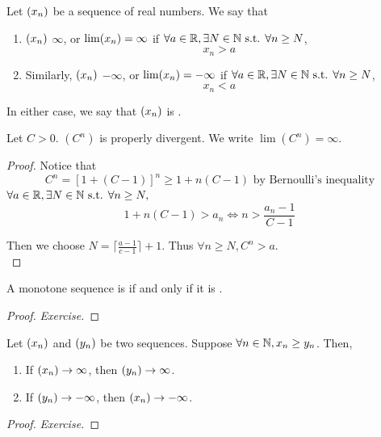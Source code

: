 \documentclass[a4paper,12pt]{article}
\begin{document}
\begin{definition}
    Let \((x_{n})\) be a sequence of real numbers. We say that 
    \begin{enumerate}
        \item \((x_{n})\)  \(\infty\), or \(\lim(x_{n})=\infty\) if \(\forall a\in\mathbb{R},\exists N\in\mathbb{N} \text{ s.t. } \forall n\ge N\),
        \[x_n>a\]
        \item Similarly, \((x_{n})\)  \(-\infty\), or \(\lim(x_{n})=-\infty\) if \(\forall a\in\mathbb{R},\exists N\in\mathbb{N} \text{ s.t. } \forall n\ge N\),
        \[x_n<a\]
    \end{enumerate}

    In either case, we say that \((x_{n})\) is .\\
\end{definition}
\begin{example}
    Let \(C>0\). \((C^n)\) is properly divergent. We write \(\lim (C^n)=\infty\).
    \begin{proof}
        Notice that \[C^n=[1+(C-1)]^n\ge 1+n(C-1)\text{ by Bernoulli's inequality}\]
         \(\forall a\in\mathbb{R}, \exists N\in\mathbb{N} \text{ s.t. } \forall n\ge N,\)
        \[1+n(C-1)>a_n\Leftrightarrow n>\frac{a_n-1}{C-1}\]

        Then we choose \(N=\lceil \frac{a-1}{c-1}\rceil+1\). Thus \(\forall n\ge N,C^n>a\).\\
    \end{proof}
\end{example}

\begin{theorem}
    A monotone sequence is  if and only if it is .
    \begin{proof}
        \textit{Exercise.}
    \end{proof}
\end{theorem}

\begin{theorem}
    Let \((x_{n})\) and \((y_{n})\) be two sequences. Suppose \(\forall n\in\mathbb{N},x_n\ge y_n\). Then,
    \begin{enumerate}
        \item If \((x_{n})\rightarrow\infty\), then \((y_{n})\rightarrow\infty\).
        \item If \((y _{n })\rightarrow - \infty\), then \((x _{n })\rightarrow -\infty\).
    \end{enumerate}
    \begin{proof}
        \textit{Exercise.}
    \end{proof}
\end{theorem}
\newpage
    
\end{document}
